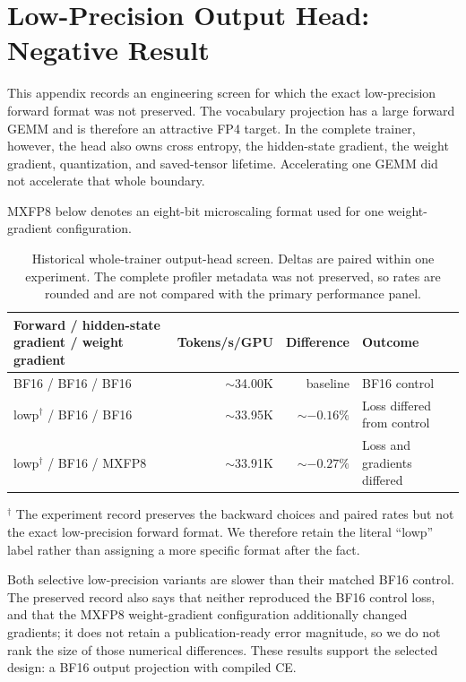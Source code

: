 \section{Low-Precision Output Head: Negative Result}
\label{app:output-head}

This appendix records an engineering screen for which the exact low-precision
forward format was not preserved. The vocabulary projection has a large
forward GEMM and is therefore an attractive FP4 target. In the complete
trainer, however, the head also owns cross entropy, the hidden-state gradient,
the weight gradient, quantization, and saved-tensor lifetime. Accelerating one
GEMM did not accelerate that whole boundary.

MXFP8 below denotes an eight-bit microscaling format used for one
weight-gradient configuration.

\begin{table}[H]
  \centering
  \caption{Historical whole-trainer output-head screen. Deltas are paired
  within one experiment. The complete profiler metadata was not preserved, so
  rates are rounded and are not compared with the primary performance panel.}
  \label{tab:head-negative}
  \begin{tabularx}{\textwidth}{YrrY}
    \toprule
    Forward / hidden-state gradient / weight gradient & Tokens/s/GPU & Difference & Outcome \\
    \midrule
    BF16 / BF16 / BF16 & $\sim$34.00K & baseline & BF16 control \\
    lowp$^{\dagger}$ / BF16 / BF16 & $\sim$33.95K & $\sim-0.16\%$ & Loss differed from control \\
    lowp$^{\dagger}$ / BF16 / MXFP8 & $\sim$33.91K & $\sim-0.27\%$ & Loss and gradients differed \\
    \bottomrule
  \end{tabularx}
\end{table}

$^{\dagger}$ The experiment record preserves the backward choices and paired
rates but not the exact low-precision forward format. We therefore retain the
literal ``lowp'' label rather than assigning a more specific format after the
fact.

Both selective low-precision variants are slower than their matched BF16
control. The preserved record also says that neither reproduced the BF16
control loss, and that the MXFP8 weight-gradient configuration additionally
changed gradients; it
does not retain a publication-ready error magnitude, so we do not rank the
size of those numerical differences. These results support the selected
design: a BF16 output projection with compiled CE.
